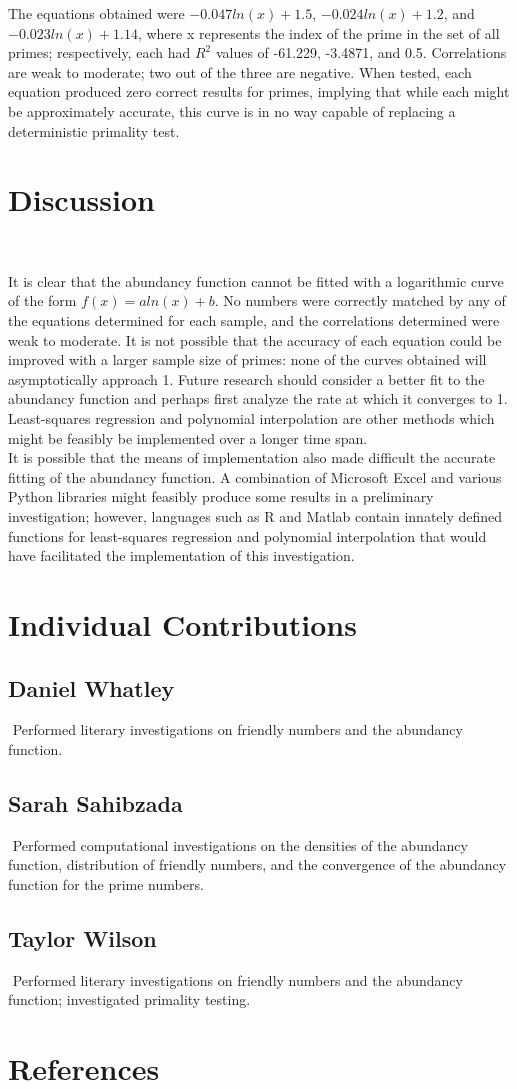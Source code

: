 \documentclass[11pt]{article}
\begin{document}
The equations obtained were $-0.047ln(x) + 1.5$, $-0.024ln(x) + 1.2$, and $-0.023ln(x) + 1.14$, where x represents the index of the prime in the set of all primes; respectively, each had $R^{2}$ values of -61.229, -3.4871, and 0.5. Correlations are weak to moderate; two out of the three are negative. When tested, each equation produced zero correct results for primes, implying that while each might be approximately accurate, this curve is in no way capable of replacing a deterministic primality test.
\section{Discussion}$ $

It is clear that the abundancy function cannot be fitted with a logarithmic curve of the form $f(x) = aln(x) + b$. No numbers were correctly matched by any of the equations determined for each sample, and the correlations determined were weak to moderate. It is not possible that the accuracy of each equation could be improved with a larger sample size of primes: none of the curves obtained will asymptotically approach 1. Future research should consider a better fit to the abundancy function and perhaps first analyze the rate at which it converges to 1. Least-squares regression and polynomial interpolation are other methods which might be feasibly be implemented over a longer time span.
\\It is possible that the means of  implementation also made difficult the accurate fitting of the abundancy function. A combination of Microsoft Excel and various Python libraries might feasibly produce some results in a preliminary investigation; however, languages such as R and Matlab contain innately defined functions for least-squares regression and polynomial interpolation that would have facilitated the implementation of this investigation.



\indent  
\section{Individual Contributions}
\subsection{Daniel Whatley}$ $
\indent Performed literary  investigations on friendly numbers and the abundancy function. 
\subsection{Sarah Sahibzada}$ $
\indent Performed computational investigations on the densities of the abundancy function, distribution of friendly numbers, and the convergence of the abundancy function for the prime numbers. 
\subsection{Taylor Wilson}$ $
\indent Performed literary  investigations on friendly numbers and the abundancy function; investigated primality testing.

\newpage
\section{References}
\end{document}
